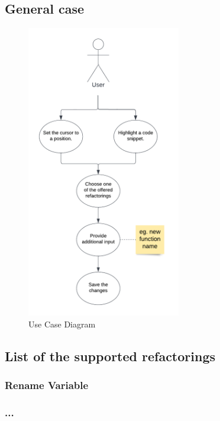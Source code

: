 \subsection{General case}



\begin{figure}[H]
	\centering
	\includegraphics[width=0.6\textwidth]{images/use_case.png}
	\caption{Use Case Diagram}
	\label{fig:usecase}
\end{figure}

\subsection{List of the supported refactorings}

\subsubsection{Rename Variable}
\subsubsection{...}


